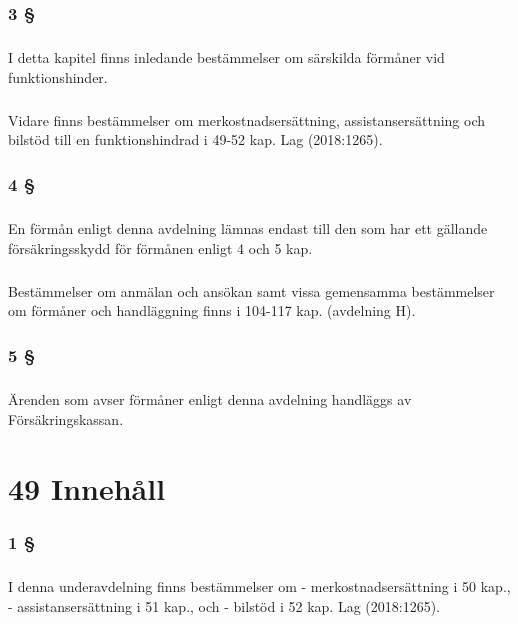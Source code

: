 \documentclass[a4paper,notitlepage,openany,10pt]{book}
\begin{document}
\subsection*{3 §}
\paragraph*{}
I detta kapitel finns inledande bestämmelser om särskilda förmåner vid funktionshinder.
\paragraph*{}
Vidare finns bestämmelser om merkostnadsersättning, assistansersättning och bilstöd till en funktionshindrad i 49-52 kap.
Lag (2018:1265).
\subsection*{4 §}
\paragraph*{}
En förmån enligt denna avdelning lämnas endast till den som har ett gällande försäkringsskydd för förmånen enligt 4 och 5 kap.
\paragraph*{}
Bestämmelser om anmälan och ansökan samt vissa gemensamma bestämmelser om förmåner och handläggning finns i 104-117 kap. (avdelning H).
\subsection*{5 §}
\paragraph*{}
Ärenden som avser förmåner enligt denna avdelning handläggs av Försäkringskassan.
\chapter*{49 Innehåll}
\subsection*{1 §}
\paragraph*{}
I denna underavdelning finns bestämmelser om
\newline - merkostnadsersättning i 50 kap.,
\newline - assistansersättning i 51 kap., och
\newline - bilstöd i 52 kap.
Lag (2018:1265).
\end{document}

